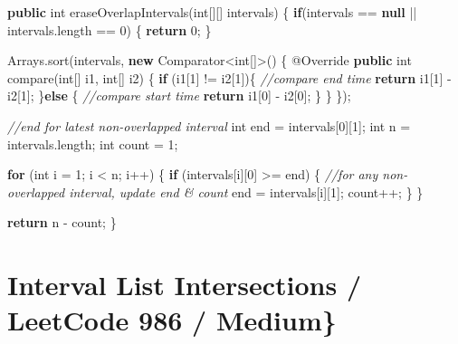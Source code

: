 \documentclass[]{book}
\newenvironment{Shaded}{\begin{snugshade}}{\end{snugshade}}
\newcommand{\AttributeTok}[1]{\textcolor[rgb]{0.77,0.63,0.00}{#1}}
\newcommand{\BuiltInTok}[1]{#1}
\newcommand{\CommentTok}[1]{\textcolor[rgb]{0.56,0.35,0.01}{\textit{#1}}}
\newcommand{\DataTypeTok}[1]{\textcolor[rgb]{0.13,0.29,0.53}{#1}}
\newcommand{\DecValTok}[1]{\textcolor[rgb]{0.00,0.00,0.81}{#1}}
\newcommand{\FunctionTok}[1]{\textcolor[rgb]{0.00,0.00,0.00}{#1}}
\newcommand{\KeywordTok}[1]{\textcolor[rgb]{0.13,0.29,0.53}{\textbf{#1}}}
\newcommand{\NormalTok}[1]{#1}
\begin{document}
\begin{Shaded}
\begin{Highlighting}[]
\KeywordTok{public} \DataTypeTok{int} \FunctionTok{eraseOverlapIntervals}\NormalTok{(}\DataTypeTok{int}\NormalTok{[][] intervals) \{}
    \KeywordTok{if}\NormalTok{(intervals == }\KeywordTok{null}\NormalTok{ || intervals.}\FunctionTok{length}\NormalTok{ == }\DecValTok{0}\NormalTok{) \{}
        \KeywordTok{return} \DecValTok{0}\NormalTok{;}
\NormalTok{    \}}

    \BuiltInTok{Arrays}\NormalTok{.}\FunctionTok{sort}\NormalTok{(intervals, }\KeywordTok{new} \BuiltInTok{Comparator}\NormalTok{<}\DataTypeTok{int}\NormalTok{[]>() \{}
        \AttributeTok{@Override}
        \KeywordTok{public} \DataTypeTok{int} \FunctionTok{compare}\NormalTok{(}\DataTypeTok{int}\NormalTok{[] i1, }\DataTypeTok{int}\NormalTok{[] i2) \{}
            \KeywordTok{if}\NormalTok{ (i1[}\DecValTok{1}\NormalTok{] != i2[}\DecValTok{1}\NormalTok{])\{}
                \CommentTok{//compare end time}
                \KeywordTok{return}\NormalTok{ i1[}\DecValTok{1}\NormalTok{] - i2[}\DecValTok{1}\NormalTok{];}
\NormalTok{            \}}\KeywordTok{else}\NormalTok{ \{}
                \CommentTok{//compare start time}
                \KeywordTok{return}\NormalTok{ i1[}\DecValTok{0}\NormalTok{] - i2[}\DecValTok{0}\NormalTok{];}
\NormalTok{            \}}
\NormalTok{        \}}
\NormalTok{    \});}

    \CommentTok{//end for latest non-overlapped interval}
    \DataTypeTok{int}\NormalTok{ end = intervals[}\DecValTok{0}\NormalTok{][}\DecValTok{1}\NormalTok{];}
    \DataTypeTok{int}\NormalTok{ n = intervals.}\FunctionTok{length}\NormalTok{;}
    \DataTypeTok{int}\NormalTok{ count = }\DecValTok{1}\NormalTok{;}

    \KeywordTok{for}\NormalTok{ (}\DataTypeTok{int}\NormalTok{ i = }\DecValTok{1}\NormalTok{; i < n; i++) \{}
        \KeywordTok{if}\NormalTok{ (intervals[i][}\DecValTok{0}\NormalTok{] >= end) \{}
            \CommentTok{//for any non-overlapped interval, update end & count}
\NormalTok{            end = intervals[i][}\DecValTok{1}\NormalTok{];}
\NormalTok{            count++;}
\NormalTok{        \}}
\NormalTok{    \}}

    \KeywordTok{return}\NormalTok{ n - count;}
\NormalTok{\}}
\end{Highlighting}
\end{Shaded}

\hypertarget{interval-list-intersections-leetcode-986-medium}{%
\section{Interval List Intersections / LeetCode 986 / Medium\}}\label{interval-list-intersections-leetcode-986-medium}}
\end{document}

